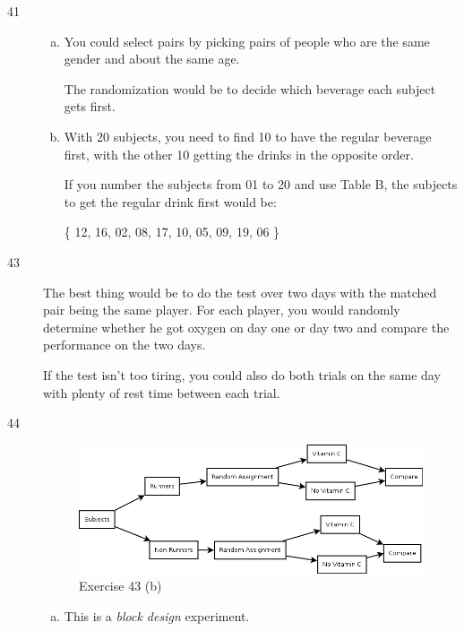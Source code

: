 \documentclass[letterpaper]{exam}
\begin{document}
\begin{description}
      \item[41] 
        \begin{enumerate}[(a)]
          \item You could select pairs by picking pairs of people who are the
            same gender and about the same age.  
            
            The randomization would be to decide which beverage each subject
            gets first.

          \item With 20 subjects, you need to find 10 to have the regular
            beverage first, with the other 10 getting the drinks in the opposite
            order.

            If you number the subjects from 01 to 20 and use Table B, the
            subjects to get the regular drink first would be:

            \{ 12, 16, 02, 08, 17, 10, 05, 09, 19, 06 \}

        \end{enumerate}

      \item[43]
        The best thing would be to do the test over two days with the matched
        pair being the same player.  For each player, you would randomly
        determine whether he got oxygen on day one or day two and compare the
        performance on the two days.

        If the test isn't too tiring, you could also do both trials on the same
        day with plenty of rest time between each trial.


      \item[44]
        \begin{figure}[H]
          \centering
          \includegraphics[scale = 0.3]{ex43.png}
          \caption{Exercise 43 (b)}\label{fig:ex43}
        \end{figure}
        \begin{enumerate}[(a)]
          \item This is a {\em block design\/} experiment.


\end{enumerate}
\end{description}
\end{document}
